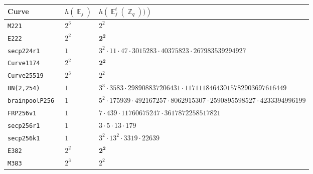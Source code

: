 \documentclass[11pt,fleqn]{article}
\newcommand{\Ejt}{\ensuremath{\BbbE^t_j(\BbbZ_q))} }
\newcommand{\Ej}{\ensuremath{\BbbE_j} }
\begin{document}
%
\begin{tabularx}{\textwidth}{llR}
\textbf{Curve}            &$h(\Ej)$ & $h(\Ejt)$ \\
\hline
\texttt{\footnotesize M221         }& $\scriptstyle 2^3$    & $\scriptstyle 2^2                                                                  $\\
\texttt{\footnotesize E222         }& $\scriptstyle 2^2$    & $\scriptstyle \mathbf{2^2}                                                                  $\\
\texttt{\footnotesize secp224r1     }& $\scriptstyle 1  $    & $\scriptstyle 3^2 \cdot 11 \cdot 47 \cdot 3015283 \cdot 40375823 \cdot 267983539294927                 $\\
\texttt{\footnotesize Curve1174     }& $\scriptstyle 2^2$    & $\scriptstyle \mathbf{2^2}                                                                  $\\
\texttt{\footnotesize Curve25519    }& $\scriptstyle 2^3$    & $\scriptstyle 2^2                                                                  $\\
\texttt{\footnotesize BN(2,254)     }& $\scriptstyle 1  $    & $\scriptstyle 3^3 \cdot 3583 \cdot 298908837206431 \cdot 11711184643015782903697616449         $\\
\texttt{\footnotesize brainpoolP256 }& $\scriptstyle 1  $    & $\scriptstyle 5^2 \cdot 175939 \cdot 492167257 \cdot 8062915307 \cdot 2590895598527 \cdot 4233394996199$\\
\texttt{\footnotesize FRP256v1      }& $\scriptstyle 1  $    & $\scriptstyle 7 \cdot 439 \cdot 11760675247 \cdot 3617872258517821                             $\\
\texttt{\footnotesize secp256r1     }& $\scriptstyle 1  $    & $\scriptstyle 3 \cdot 5 \cdot 13 \cdot 179                                                     $\\
\texttt{\footnotesize secp256k1     }& $\scriptstyle 1  $    & $\scriptstyle 3^2 \cdot 13^2 \cdot 3319 \cdot 22639                                            $\\
\texttt{\footnotesize E382          }& $\scriptstyle 2^2$    & $\scriptstyle \mathbf{2^2}                                                                  $\\
\texttt{\footnotesize M383          }& $\scriptstyle 2^3$    & $\scriptstyle 2^2                                                                  $\\

\end{tabularx}
\end{document}
